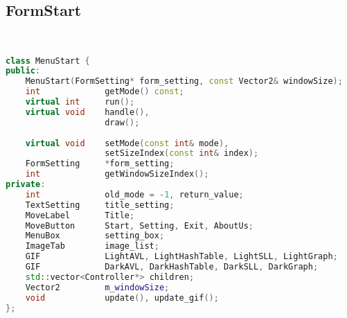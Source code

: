 \subsection{FormStart}
\begin{lstlisting}[language=C++]


class MenuStart {
public:
    MenuStart(FormSetting* form_setting, const Vector2& windowSize);
    int             getMode() const;
    virtual int     run();
    virtual void    handle(),
                    draw();
                    
    virtual void    setMode(const int& mode),
                    setSizeIndex(const int& index);
    FormSetting     *form_setting;
    int             getWindowSizeIndex();
private:
    int             old_mode = -1, return_value;
    TextSetting     title_setting;
    MoveLabel       Title;
    MoveButton      Start, Setting, Exit, AboutUs;
    MenuBox         setting_box;
    ImageTab        image_list;
    GIF             LightAVL, LightHashTable, LightSLL, LightGraph;
    GIF             DarkAVL, DarkHashTable, DarkSLL, DarkGraph;
    std::vector<Controller*> children;
    Vector2         m_windowSize;
    void            update(), update_gif();
};






\end{lstlisting}
